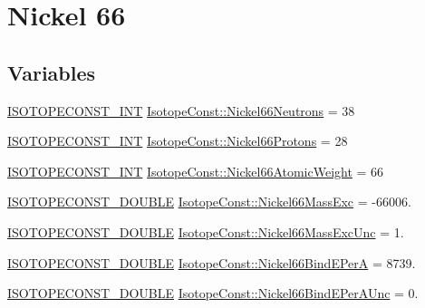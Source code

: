 \hypertarget{group___isotope_const-_nickel-_ni66}{}\section{Nickel 66}
\label{group___isotope_const-_nickel-_ni66}
\subsection*{Variables}
\begin{DoxyCompactItemize}
\item 
\mbox{\hyperlink{group___isotope_const-_macros_ga5f18360b3e99483a35c32d789e62621c}{I\+S\+O\+T\+O\+P\+E\+C\+O\+N\+S\+T\+\_\+\+I\+NT}} \mbox{\hyperlink{group___isotope_const-_nickel-_ni66_gaa231b9c46aa5acb2b56353b1bcc38238}{Isotope\+Const\+::\+Nickel66\+Neutrons}} = 38
\item 
\mbox{\hyperlink{group___isotope_const-_macros_ga5f18360b3e99483a35c32d789e62621c}{I\+S\+O\+T\+O\+P\+E\+C\+O\+N\+S\+T\+\_\+\+I\+NT}} \mbox{\hyperlink{group___isotope_const-_nickel-_ni66_ga12dcff54dde3e76343715b88e6fbdb46}{Isotope\+Const\+::\+Nickel66\+Protons}} = 28
\item 
\mbox{\hyperlink{group___isotope_const-_macros_ga5f18360b3e99483a35c32d789e62621c}{I\+S\+O\+T\+O\+P\+E\+C\+O\+N\+S\+T\+\_\+\+I\+NT}} \mbox{\hyperlink{group___isotope_const-_nickel-_ni66_ga95bbe3d92bbe242ac020d906da0be108}{Isotope\+Const\+::\+Nickel66\+Atomic\+Weight}} = 66
\item 
\mbox{\hyperlink{group___isotope_const-_macros_ga8f45a7272ce02c0b4c65c44636ed719a}{I\+S\+O\+T\+O\+P\+E\+C\+O\+N\+S\+T\+\_\+\+D\+O\+U\+B\+LE}} \mbox{\hyperlink{group___isotope_const-_nickel-_ni66_ga59001b78a44f658cd285128e188ae1e7}{Isotope\+Const\+::\+Nickel66\+Mass\+Exc}} = -\/66006.
\item 
\mbox{\hyperlink{group___isotope_const-_macros_ga8f45a7272ce02c0b4c65c44636ed719a}{I\+S\+O\+T\+O\+P\+E\+C\+O\+N\+S\+T\+\_\+\+D\+O\+U\+B\+LE}} \mbox{\hyperlink{group___isotope_const-_nickel-_ni66_ga846c8c675af7fc0cdd3f72cbc3ef8b7f}{Isotope\+Const\+::\+Nickel66\+Mass\+Exc\+Unc}} = 1.
\item 
\mbox{\hyperlink{group___isotope_const-_macros_ga8f45a7272ce02c0b4c65c44636ed719a}{I\+S\+O\+T\+O\+P\+E\+C\+O\+N\+S\+T\+\_\+\+D\+O\+U\+B\+LE}} \mbox{\hyperlink{group___isotope_const-_nickel-_ni66_ga916aab8e1422b126df8fe3dc3717280b}{Isotope\+Const\+::\+Nickel66\+Bind\+E\+PerA}} = 8739.
\item 
\mbox{\hyperlink{group___isotope_const-_macros_ga8f45a7272ce02c0b4c65c44636ed719a}{I\+S\+O\+T\+O\+P\+E\+C\+O\+N\+S\+T\+\_\+\+D\+O\+U\+B\+LE}} \mbox{\hyperlink{group___isotope_const-_nickel-_ni66_gaaacdc363108c613a927f55f0074c3b96}{Isotope\+Const\+::\+Nickel66\+Bind\+E\+Per\+A\+Unc}} = 0.

\end{DoxyCompactItemize}
